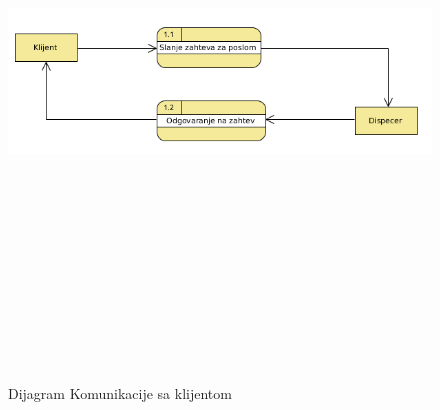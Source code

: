\documentclass[10 pt]{article}
\begin{document}
	\begin{figure}[H]
		\centering
		\includegraphics[width=15cm,height=15cm,keepaspectratio]{slike/KomunikacijaSaKlijentom.png}\\
		\caption{Dijagram Komunikacije sa klijentom}
	\end{figure}
	
\end{document}
